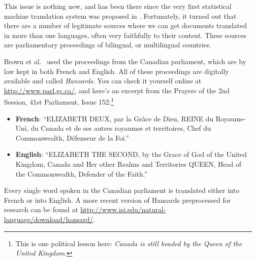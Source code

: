 \documentclass{report}
\begin{document}
This issue is nothing new, and has been there since the very first statistical
machine translation system was proposed in \cite{brown1990statistical}.
Fortunately, it turned out that there are a number of legitimate sources where
we can get documents translated in more than one languages, often very
faithfully to their content. These sources are parliamentary proceedings of
bilingual, or multilingual countries.

Brown et al.~\cite{brown1990statistical} used the proceedings from the Canadian
parliament, which are by law kept in both French and English. All of these
proceedings are digitally available and called {\em Hansards}. You can check it
yourself online at \url{http://www.parl.gc.ca/}, and here's an excerpt from the
Prayers of the 2nd Session, 41st Parliament, Issue 152:\footnote{
    This is one political lesson here: {\em Canada is still headed by the Queen of
    the United Kingdom}.
}
\begin{itemize}
    \itemsep 0em
    \item {\bf French}: ``ELIZABETH DEUX, par la Grâce de Dieu, REINE du
        Royaume-Uni, du Canada et de ses autres royaumes et territoires, Chef du
        Commonwealth, D\'efenseur de la Foi.''
    \item {\bf English}: ``ELIZABETH THE SECOND, by the Grace of God of the
        United Kingdom, Canada and Her other Realms and Territories QUEEN, Head
        of the Commonwealth, Defender of the Faith.''
\end{itemize}
Every single word spoken in the Canadian parliament is translated either into
French or into English. A more recent version of Hansards preprocessed for
research can be found at
\url{http://www.isi.edu/natural-language/download/hansard/}.
\end{document}
